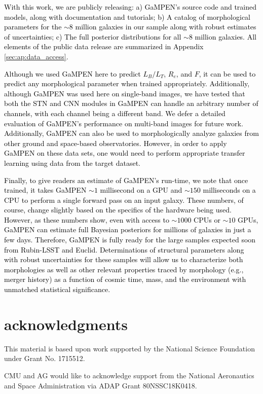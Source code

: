 \documentclass[linenumbers,twocolumn,twocolappendix]{aastex631}
\newcommand\gampen{GaMPEN}
\begin{document}
\begin{CJK*}{UTF8}{gbsn}
\textcolor{black}{With this work, we are publicly releasing: a) \gampen{}'s source code and trained models, along with documentation and tutorials; b) A catalog of morphological parameters for the $\sim8$ million galaxies in our sample along with robust estimates of uncertainties; c) The full posterior distributions for all $\sim8$ million galaxies. All elements of the public data release are summarized in Appendix \ref{sec:ap:data_access}.}

\textcolor{black}{Although we used \gampen{} here to predict $L_B/L_T$, $R_e$, and $F$, it can be used to predict any morphological parameter when trained appropriately. Additionally, although \gampen{} was used here on single-band images, we have tested that both the STN and CNN modules in \gampen{} can handle an arbitrary number of channels, with each channel being a different band. We defer a detailed evaluation of \gampen{}'s performance on multi-band images for future work. Additionally, \gampen{} can also be used to morphologically analyze galaxies from other ground and space-based observatories. However, in order to apply \gampen{} on these data sets, one would need to perform appropriate transfer learning using data from the target dataset.}

\textcolor{black}{Finally, to give readers an estimate of \gampen{}'s run-time, we note that once trained, it takes \gampen{} $\sim1$ millisecond on a GPU and $\sim150$ milliseconds on a CPU to perform a single forward pass on an input galaxy. These numbers, of course, change slightly based on the specifics of the hardware being used. However, as these numbers show, even with access to $\sim1000$ CPUs or $\sim10$ GPUs, \gampen{} can estimate full Bayesian posteriors for millions of galaxies in just a few days. Therefore, \gampen{} is fully ready for the large samples expected soon from Rubin-LSST and Euclid. Determinations of structural parameters along with robust uncertainties for these samples will allow us to characterize both morphologies as well as other relevant properties traced by morphology (e.g., merger history) as a function of cosmic time, mass, and the environment with unmatched statistical significance.}

\section*{acknowledgments}
This material is based upon work supported by the National Science Foundation under Grant No. 1715512.

CMU and AG would like to acknowledge support from the National Aeronautics and Space Administration via ADAP Grant 80NSSC18K0418. 


\end{CJK*}
\end{document}
